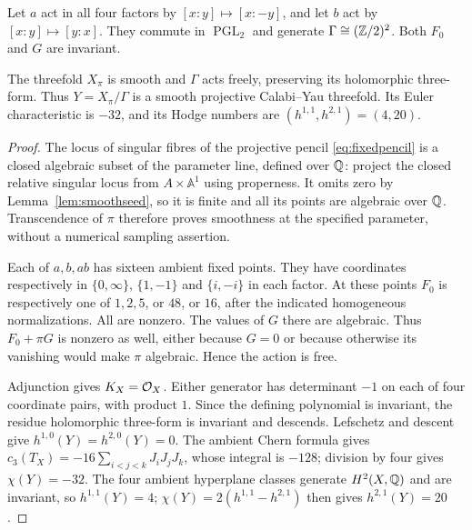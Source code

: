 Let $a$ act in all four factors by $[x:y]\mapsto[x:-y]$, and let $b$
act by $[x:y]\mapsto[y:x]$. They commute in $\operatorname{PGL}_2$ and
generate $\Gamma\cong(\mathbb{Z}/2)^2$. Both $F_0$ and $G$ are invariant.

\begin{theorem}\label{thm:fixedquotient}
The threefold $X_\pi$ is smooth and $\Gamma$ acts freely, preserving its
holomorphic three-form. Thus $Y=X_\pi/\Gamma$ is a smooth projective
Calabi--Yau threefold. Its Euler characteristic is $-32$, and its
Hodge numbers are $(h^{1,1},h^{2,1})=(4,20)$.
\end{theorem}
\begin{proof}
The locus of singular fibres of the projective pencil
\eqref{eq:fixedpencil} is a closed algebraic subset of the parameter line,
defined over $\mathbb{Q}$: project the closed relative singular locus from
$A\times\mathbb A^1$ using properness. It omits zero by
Lemma~\ref{lem:smoothseed}, so it is finite and all its points are
algebraic over $\mathbb{Q}$. Transcendence of $\pi$ therefore proves smoothness
at the specified parameter, without a numerical sampling assertion.

Each of $a,b,ab$ has sixteen ambient fixed points. They have coordinates
respectively in $\{0,\infty\}$, $\{1,-1\}$ and $\{i,-i\}$ in each
factor. At these points $F_0$ is respectively one of $1,2,5$, or $48$,
or $16$, after the indicated homogeneous normalizations. All are nonzero.
The values of $G$ there are algebraic. Thus $F_0+\pi G$ is nonzero as
well, either because $G=0$ or because otherwise its vanishing would make
$\pi$ algebraic. Hence the action is free.

Adjunction gives $K_X=\mathcal{O}_X$. Either generator has determinant $-1$
on each of four coordinate pairs, with product $1$. Since the defining
polynomial is invariant, the residue holomorphic three-form is invariant
and descends. Lefschetz and descent give $h^{1,0}(Y)=h^{2,0}(Y)=0$.
The ambient Chern formula gives $c_3(T_X)=-16\sum_{i<j<k}J_iJ_jJ_k$,
whose integral is $-128$;
division by four gives $\chi(Y)=-32$. The four ambient hyperplane
classes generate $H^2(X,\mathbb{Q})$ and are invariant, so $h^{1,1}(Y)=4$;
$\chi(Y)=2(h^{1,1}-h^{2,1})$ then gives $h^{2,1}(Y)=20$.
\end{proof}

